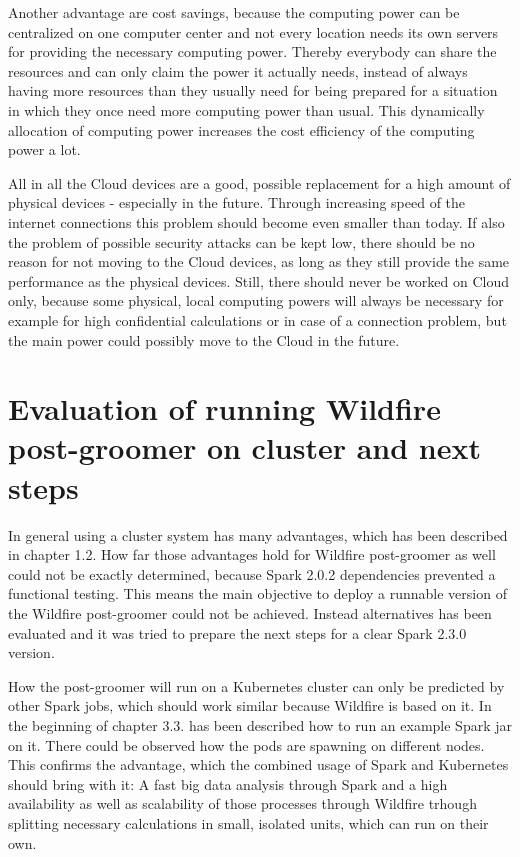 Another advantage are cost savings, because the computing power can be centralized on one computer center and not every location needs its own servers for providing the necessary computing power. Thereby everybody can share the resources and can only claim the power it actually needs, instead of always having more resources than they usually need for being prepared for a situation in which they once need more computing power than usual. This dynamically allocation of computing power increases the cost efficiency of the computing power a lot.

All in all the Cloud devices are a good, possible replacement for a high amount of physical devices - especially in the future. Through increasing speed of the internet connections this problem should become even smaller than today. If also the problem of possible security attacks can be kept low, there should be no reason for not moving to the Cloud devices, as long as they still provide the same performance as the physical devices. Still, there should never be worked on Cloud only, because some physical, local computing powers will always be necessary for example for high confidential calculations or in case of a connection problem, but the main power could possibly move to the Cloud in the future.

\section{Evaluation of running Wildfire post-groomer on cluster and next steps}

In general using a cluster system has many advantages, which has been described in chapter 1.2. How far those advantages hold for Wildfire post-groomer as well could not be exactly determined, because Spark 2.0.2 dependencies prevented a functional testing. This means the main objective to deploy a runnable version of the Wildfire post-groomer could not be achieved. Instead alternatives has been evaluated and it was tried to prepare the next steps for a clear Spark 2.3.0 version.

How the post-groomer will run on a Kubernetes cluster can only be predicted by other Spark jobs, which should work similar because Wildfire is based on it. In the beginning of chapter 3.3. has been described how to run an example Spark jar on it. There could be observed how the pods are spawning on different nodes. This confirms the advantage, which the combined usage of Spark and Kubernetes should bring with it: A fast big data analysis through Spark and a high availability as well as scalability of those processes through Wildfire trhough splitting necessary calculations in small, isolated units, which can run on their own.

